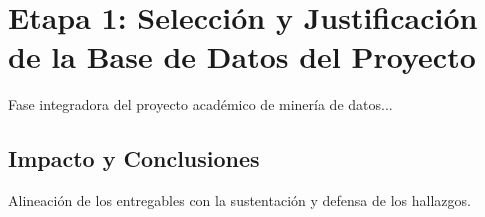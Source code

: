 \section{Etapa 1: Selección y Justificación de la Base de Datos del Proyecto}
\label{sec:u4_seleccion_base_datos}
Fase integradora del proyecto académico de minería de datos...

\subsection{Impacto y Conclusiones}
Alineación de los entregables con la sustentación y defensa de los hallazgos.
